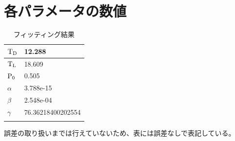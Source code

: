 \section{各パラメータの数値}
\begin{table}[h]
  \begin{tabular}{|l|l|}
  \hline
  $\rm{T_D}$    & 12.288            \\ \hline
  $\rm{T_L}$    & 18.609            \\ \hline
  $\rm{P_0}$    & 0.505             \\ \hline
  $\alpha$ & 3.788e-15         \\ \hline
  $\beta$  & 2.548e-04         \\ \hline
  $\gamma$ & 76.36218400202554 \\ \hline
  \caption{フィッティング結果}
  \end{tabular}
  \end{table}

誤差の取り扱いまでは行えていないため、表には誤差なしで表記している。




